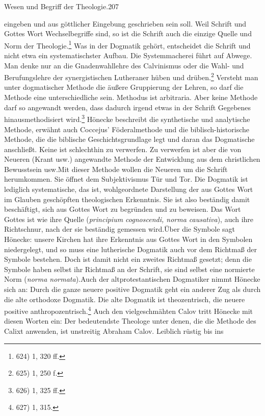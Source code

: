 \vspace*{12pt}
\noindent\hspace*{\fill}\textrm{Wesen und Begriff der Theologie.}\hspace*{\fill}\textrm{207}\par

\vspace{12pt}
\noindent
eingeben und aus göttlicher Eingebung geschrieben sein soll. Weil Schrift und Gottes Wort Wechselbegriffe sind, so ist die Schrift auch die einzige Quelle und Norm der Theologie.\footnote{624) 1, 320 ff.} Was in der Dogmatik gehört, entscheidet die Schrift und nicht etwa ein systematischster Aufbau. Die Systemmacherei führt auf Abwege. Man denke nur an die Gnadenwahllehre des Calvinismus oder die Wahl- und Berufungslehre der synergistischen Lutheraner hüben und drüben.\footnote{625) 1, 250 f.} Versteht man unter dogmatischer Methode die äußere Gruppierung der Lehren, so darf die Methode eine unterschiedliche sein. Methodus ist arbitraria. Aber keine Methode darf so angewandt werden, dass dadurch irgend etwas in der Schrift Gegebenes hinausmethodisiert wird.\footnote{626) 1, 325 ff.} Hönecke beschreibt die synthetische und analytische Methode, erwähnt auch Coccejus' Föderalmethode und die biblisch-historische Methode, die die biblische Geschichtsgrundlage legt und daran das Dogmatische anschließt. Keine ist schlechthin zu verwerfen. \glqq Zu verwerfen ist aber die von Neueren (Krant usw.) angewandte Methode der Entwicklung aus dem christlichen Bewusstsein usw.\grqq Mit dieser Methode wollen die Neueren \glqq um die Schrift herumkommen. Sie öffnet dem Subjektivismus Tür und Tor\grqq. \glqq Die Dogmatik ist lediglich systematische, das ist, wohlgeordnete Darstellung der aus Gottes Wort im Glauben geschöpften theologischen Erkenntnis. Sie ist also beständig damit beschäftigt, sich aus Gottes Wort zu begründen und zu beweisen. Das Wort Gottes ist wie ihre Quelle (\emph{principium cognoscendi, norma causativa}), auch ihre Richtschnur, nach der sie beständig gemessen wird.\grqq Über die Symbole sagt Hönecke: \glqq unsere Kirchen hat ihre Erkenntnis aus Gottes Wort in den Symbolen niedergelegt, und so muss eine lutherische Dogmatik auch vor dem Richtmaß der Symbole bestehen. Doch ist damit nicht ein zweites Richtmaß gesetzt; denn die Symbole haben selbst ihr Richtmaß an der Schrift, sie sind selbst eine normierte Norm (\emph{norma normata}).\grqq Auch der altprotestantischen Dogmatiker nimmt Hönecke sich an: \glqq Durch die ganze neuere positive Dogmatik geht ein anderer Zug als durch die alte orthodoxe Dogmatik. Die alte Dogmatik ist theozentrisch, die neuere positive anthropozentrisch\grqq.\footnote{627) 1, 315.} Auch den vielgeschmähten Calov tritt Hönecke mit diesen Worten ein: \glqq Der bedeutendste Theologe unter denen, die die Methode des Calixt anwenden, ist unstreitig Abraham Calov. Leiblich rüstig bis ins